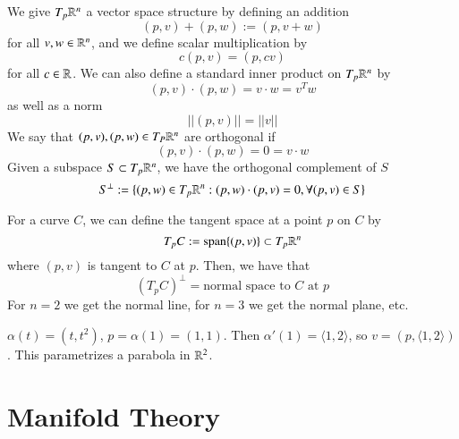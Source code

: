 \documentclass[12pt]{report}
\begin{document}
\begin{rmk}{}{}
    We give $T_p\mathbb R^n$ a vector space structure by defining an addition \begin{equation}
        (p,v) + (p,w) := (p,v+w)
    \end{equation}
    for all $v,w \in \mathbb R^n$, and we define scalar multiplication by \begin{equation}
        c(p,v) = (p,cv)
    \end{equation}
    for all $c \in \mathbb R$. We can also define a standard inner product on $T_p\mathbb R^n$ by \begin{equation}
        (p,v) \cdot (p,w) = v\cdot w = v^Tw
    \end{equation}
    as well as a norm \begin{equation}
        ||(p,v)|| = ||v||
    \end{equation}
    We say that $(p,v),(p,w) \in T_P\mathbb R^n$ are orthogonal if \begin{equation}
        (p,v) \cdot (p,w) = 0 = v\cdot w
    \end{equation}
    Given a subspace $S \subset T_p\mathbb R^n$, we have the orthogonal complement of $S$ \begin{equation}
        S^{\perp} := \{(p,w) \in T_p\mathbb R^n: (p,w)\cdot (p,v) = 0,\forall (p,v) \in S\}
    \end{equation}
\end{rmk}


\begin{defn}{}{}
    For a curve $C$, we can define the tangent space at a point $p$ on $C$ by \begin{equation}
        T_pC := \operatorname{span}\{(p,v)\} \subset T_p\mathbb R^n
    \end{equation}
    where $(p,v)$ is tangent to $C$ at $p$. Then, we have that \begin{equation}
        (T_pC)^{\perp} = \text{normal space to $C$ at $p$}
    \end{equation}
    For $n = 2$ we get the normal line, for $n = 3$ we get the normal plane, etc.
\end{defn}

\begin{eg}{}{}
    $\alpha(t) = (t,t^2)$, $p = \alpha(1) = (1,1)$. Then $\alpha'(1) = \langle 1,2\rangle$, so $v = (p,\langle 1, 2\rangle)$. This parametrizes a parabola in $\mathbb R^2$.
\end{eg}


\part{Manifold Theory}
\end{document}
